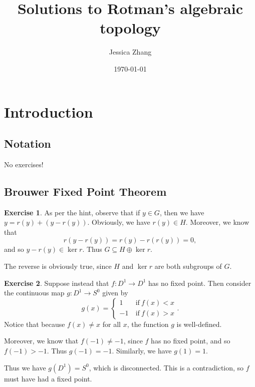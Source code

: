 \documentclass[10pt]{article}
\title{Solutions to Rotman's algebraic topology}
\author{Jessica Zhang}
\date{\today}
\theoremstyle{definition}
\newtheorem{intex}{Exercise}[section]
\newenvironment{exercise}{\begin{intex}\label{\theintex}}{\end{intex}}
\begin{document}
\begin{titlepage}
\centering
\vspace*{\fill}
{\LARGE\bfseries\sffamily\thetitle} 

\vspace{2em}

{\large\sffamily\theauthor} 

\vspace{1em}

{\large\sffamily\thedate}
\vspace*{\fill}
\end{titlepage}

\tableofcontents

\newpage 

\section{Introduction} 
\subsection{Notation} 
No exercises! 

\subsection{Brouwer Fixed Point Theorem} 
\begin{exercise} \leavevmode
As per the hint, observe that if $y\in G$, then we have $y=r(y)+(y-r(y))$. Obviously, we have $r(y)\in H$. Moreover, we know that \[r(y-r(y))=r(y)-r(r(y))=0,\] and so $y-r(y)\in\ker r$. Thus $G\subseteq H\oplus\ker r$. 

The reverse is obviously true, since $H$ and $\ker r$ are both subgroups of $G$. 
\end{exercise} 

\begin{exercise} \leavevmode
Suppose instead that $f:D^1\to D^1$ has no fixed point. Then consider the continuous map $g:D^1\to S^0$ given by \[g(x)=\begin{cases}1&~\text{if}~f(x)<x\\-1&~\text{if}~f(x)>x\end{cases}.\] Notice that because $f(x)\ne x$ for all $x$, the function $g$ is well-defined. 

Moreover, we know that $f(-1)\ne-1$, since $f$ has no fixed point, and so $f(-1)>-1$. Thus $g(-1)=-1$. Similarly, we have $g(1)=1$. 

Thus we have $g(D^1)=S^0$, which is disconnected. This is a contradiction, so $f$ must have had a fixed point. 
\end{exercise} 
\end{document}
